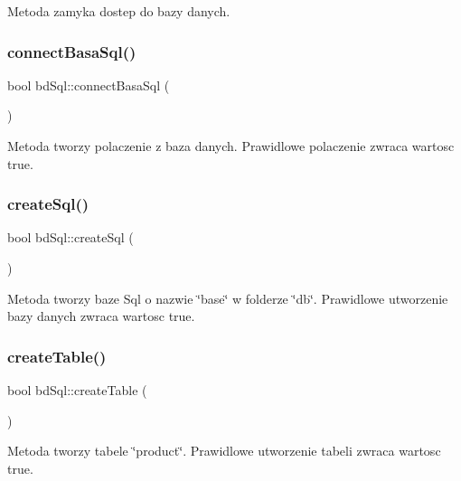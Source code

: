 Metoda zamyka dostep do bazy danych. 

\mbox{\label{classbd_sql_a9da02a1aaec248a01a337e04dd89c0ec}} 
\subsubsection{\texorpdfstring{connect\+Basa\+Sql()}{connectBasaSql()}}
{\footnotesize\ttfamily bool bd\+Sql\+::connect\+Basa\+Sql (\begin{DoxyParamCaption}{ }\end{DoxyParamCaption})}

Metoda tworzy polaczenie z baza danych. Prawidlowe polaczenie zwraca wartosc true. \mbox{\label{classbd_sql_a578d57e681bdbfda8a324e35910ce24f}} 
\subsubsection{\texorpdfstring{create\+Sql()}{createSql()}}
{\footnotesize\ttfamily bool bd\+Sql\+::create\+Sql (\begin{DoxyParamCaption}{ }\end{DoxyParamCaption})}

Metoda tworzy baze Sql o nazwie \char`\"{}base\char`\"{} w folderze \char`\"{}db\char`\"{}. Prawidlowe utworzenie bazy danych zwraca wartosc true. \mbox{\label{classbd_sql_a7868146c7d38dd16dd6b9f2934af109c}} 
\subsubsection{\texorpdfstring{create\+Table()}{createTable()}}
{\footnotesize\ttfamily bool bd\+Sql\+::create\+Table (\begin{DoxyParamCaption}{ }\end{DoxyParamCaption})}

Metoda tworzy tabele \char`\"{}product\char`\"{}. Prawidlowe utworzenie tabeli zwraca wartosc true. \mbox{\label{classbd_sql_ac9e239ec1308af48b936e9750f8d3bfa}} 

